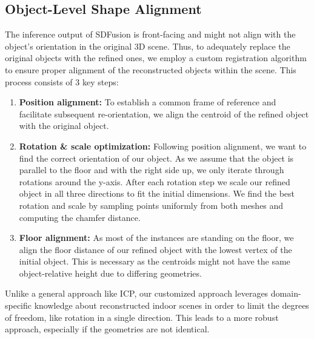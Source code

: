 \subsection{Object-Level Shape Alignment}
The inference output of SDFusion is front-facing and might not align with the object's orientation in the original 3D scene. Thus, to adequately replace the original objects with the refined ones, we employ a custom registration algorithm to ensure proper alignment of the reconstructed objects within the scene. This process consists of 3 key steps:
\begin{enumerate}
    \item \textbf{Position alignment:} To establish a common frame of reference and facilitate subsequent re-orientation, we align the centroid of the refined object with the original object. 
    
    \item \textbf{Rotation \& scale optimization:} Following position alignment, we want to find the correct orientation of our object. As we assume that the object is parallel to the floor and with the right side up, we only iterate through rotations around the y-axis. After each rotation step we scale our refined object in all three directions to fit the initial dimensions. We find the best rotation and scale by sampling points uniformly from both meshes and computing the chamfer distance.  
    
    \item \textbf{Floor alignment:} As most of the instances are standing on the floor, we align the floor distance of our refined object with the lowest vertex of the initial object. This is necessary as the centroids might not have the same object-relative height due to differing geometries. 
\end{enumerate}
Unlike a general approach like ICP, our customized approach leverages domain-specific knowledge about reconstructed indoor scenes in order to limit the degrees of freedom, like rotation in a single direction. This leads to a more robust approach, especially if the geometries are not identical.  